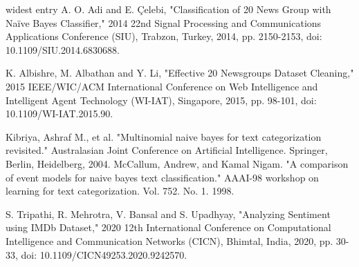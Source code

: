 \documentclass[10pt]{article}
\begin{document}
\newpage
\begin{thebibliography}{widest entry}
     A. O. Adi and E. Çelebi, "Classification of 20 News Group with Naïve Bayes Classifier," 2014 22nd Signal Processing and Communications Applications Conference (SIU), Trabzon, Turkey, 2014, pp. 2150-2153, doi: 10.1109/SIU.2014.6830688.

    \bibitem[2] K. Albishre, M. Albathan and Y. Li, "Effective 20 Newsgroups Dataset Cleaning," 2015 IEEE/WIC/ACM International Conference on Web Intelligence and Intelligent Agent Technology (WI-IAT), Singapore, 2015, pp. 98-101, doi: 10.1109/WI-IAT.2015.90.

    \bibitem[3] Kibriya, Ashraf M., et al. "Multinomial naive bayes for text categorization revisited." Australasian Joint Conference on Artificial Intelligence. Springer, Berlin, Heidelberg, 2004.
    \bibitem[4] McCallum, Andrew, and Kamal Nigam. "A comparison of event models for naive bayes text classification." AAAI-98 workshop on learning for text categorization. Vol. 752. No. 1. 1998.

    \bibitem[5] S. Tripathi, R. Mehrotra, V. Bansal and S. Upadhyay, "Analyzing Sentiment using IMDb Dataset," 2020 12th International Conference on Computational Intelligence and Communication Networks (CICN), Bhimtal, India, 2020, pp. 30-33, doi: 10.1109/CICN49253.2020.9242570.

\end{thebibliography}
\end{document}
